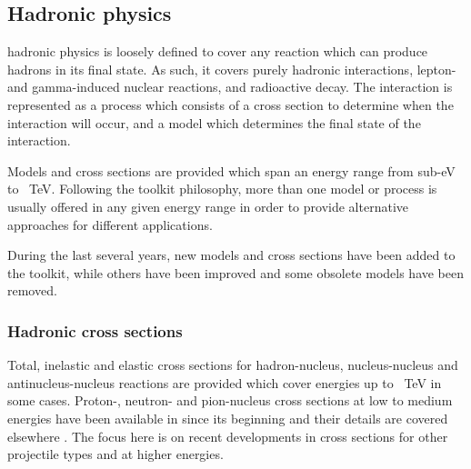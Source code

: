 
\subsection{\textbf{Hadronic physics}}\label{sec:hadphys}
\Gfour{} hadronic physics is loosely defined to cover any reaction which can
produce hadrons in its final state.  As such, it covers purely hadronic
interactions, lepton- and gamma-induced nuclear reactions, and radioactive
decay.  The interaction is represented as a \Gfour{} process which consists of
a cross section to determine when the interaction will occur, and a model which
determines the final state of the interaction.    

Models and cross sections are provided which span an energy range from sub-eV to
~TeV.  Following the toolkit philosophy, more than one model or process is 
usually offered in any given energy range in order to provide alternative 
approaches for different applications. 

During the last several years, new models and cross sections have been added
to the toolkit, while others have been improved and some obsolete models have
been removed.

\newcommand{\incl}{INCL}
\newcommand{\inclxx}{INCL++}
\newcommand{\abla}{ABLA~V3}


\subsubsection{Hadronic cross sections}\label{sec:crosssections}
Total, inelastic and elastic cross sections for hadron-nucleus, nucleus-nucleus
and antinucleus-nucleus reactions are provided which cover energies up to ~TeV 
in some cases.  Proton-, neutron- and pion-nucleus cross sections at low to 
medium energies have been available in \Gfour{} since its beginning and their 
details are covered elsewhere \cite{bib:generalpaper2}.  The focus here is on 
recent developments in cross sections for other projectile types and at higher
energies. \\

